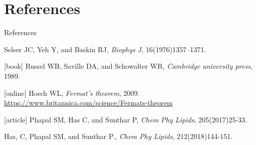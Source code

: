 \documentclass{beamer}
\begin{document}
\section{References}

\begin{frame}{References}	
	\scriptsize
	\begin{thebibliography}{}
				
		 Selser JC, Yeh Y, and Baskin RJ, \emph{Biophys J}, 16(1976)1357--1371.
		
		 Russel WB, Saville DA, and Schowalter WR,  \emph{Cambridge university press}, 1989.  
		
		[online]
		 Hosch WL, \emph{Fermat's theorem}, 2009. \url{https://www.britannica.com/science/Fermats-theorem}
		
		[article]
		 Phapal SM, Has C, and Sunthar P, \emph{Chem Phy Lipids}, 205(2017)25-33.
		
		 Has, C, Phapal SM, and Sunthar P., \emph{Chem Phy Lipids}, 212(2018)144-151.					 
		
	\end{thebibliography}
\end{frame}

\end{document}
